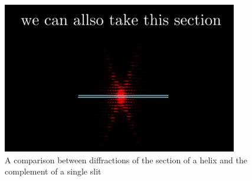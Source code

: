 \begin{figure}[H]
    \includegraphics[width=0.9\columnwidth]{figures/Single slit section.jpg}
    \caption{A comparison between diffractions of the section of a helix and the complement of a single slit}
    \label{fig:Single slit section}
\end{figure}